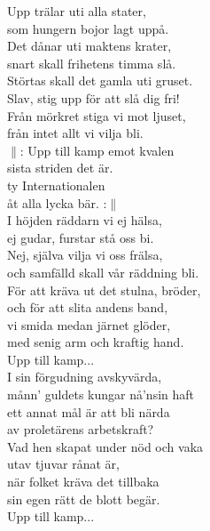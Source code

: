 \documentclass[a6paper, 10pt, twoside]{article}
\begin{document}
\begin{center}
\end{center}
\begin{lyrics}
Upp trälar uti alla stater, \\
som hungern bojor lagt uppå. \\
Det dånar uti maktens krater, \\
snart skall frihetens timma slå. \\
Störtas skall det gamla uti gruset. \\
Slav, stig upp för att slå dig fri! \\
Från mörkret stiga vi mot ljuset, \\
från intet allt vi vilja bli. \\
\newline
$\|$: Upp till kamp emot kvalen \\
sista striden det är. \\
ty Internationalen \\
åt alla lycka bär. :$\|$\\
\newline
I höjden räddarn vi ej hälsa, \\
ej gudar, furstar stå oss bi. \\
Nej, själva vilja vi oss frälsa, \\
och samfälld skall vår räddning bli. \\
För att kräva ut det stulna, bröder, \\
och för att slita andens band, \\
vi smida medan järnet glöder, \\
med senig arm och kraftig hand.\\ 
\newline
Upp till kamp... \\
\newpage 
\noindent
I sin förgudning avskyvärda, \\
månn' guldets kungar nå'nsin haft \\
ett annat mål är att bli närda \\
av proletärens arbetskraft? \\
Vad hen skapat under nöd och vaka \\
utav tjuvar rånat är, \\
när folket kräva det tillbaka \\
sin egen rätt de blott begär. \\
\newline
Upp till kamp... \\

\end{lyrics}
\end{document}
